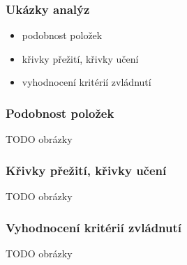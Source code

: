 \documentclass[bigger]{beamer}
\begin{document}
\begin{frame}
  \frametitle{Ukázky analýz}

  \begin{itemize}
  \item podobnost položek
  \item křivky přežití, křivky učení
  \item vyhodnocení kritérií zvládnutí
  \end{itemize}
\end{frame}

\begin{frame}
  \frametitle{Podobnost položek}

  TODO obrázky
\end{frame}

\begin{frame}
  \frametitle{Křivky přežití, křivky učení}

  TODO obrázky
\end{frame}

\begin{frame}
  \frametitle{Vyhodnocení kritérií zvládnutí}

  TODO obrázky
\end{frame}
\end{document}
